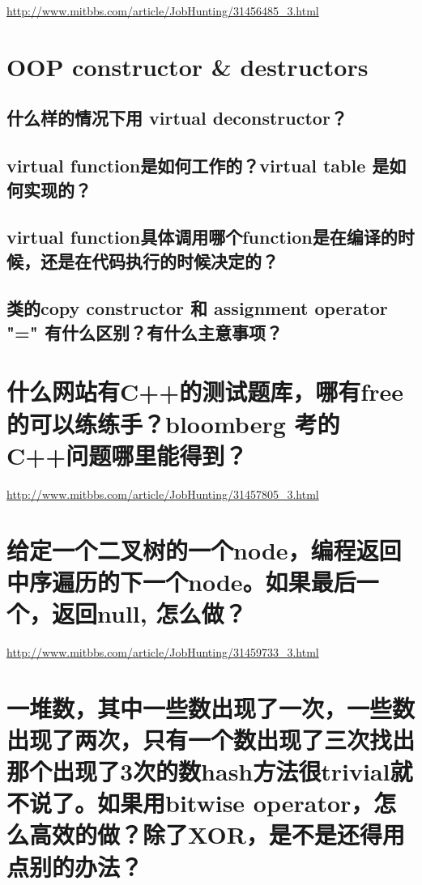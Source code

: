 \documentclass[12pt]{book}
\begin{document}
\url{http://www.mitbbs.com/article/JobHunting/31456485_3.html}

\section{OOP constructor \& destructors}
\label{sec-13-8}
\subsection{什么样的情况下用 virtual deconstructor？}
\label{sec-13-8-1}
\subsection{virtual function是如何工作的？virtual table 是如何实现的？}
\label{sec-13-8-2}
\subsection{virtual function具体调用哪个function是在编译的时候，还是在代码执行的时候决定的？}
\label{sec-13-8-3}
\subsection{类的copy constructor 和 assignment operator "=" 有什么区别？有什么主意事项？}
\label{sec-13-8-4}

\section{什么网站有C++的测试题库，哪有free的可以练练手？bloomberg 考的C++问题哪里能得到？}
\label{sec-13-9}

\url{http://www.mitbbs.com/article/JobHunting/31457805_3.html}

\section{给定一个二叉树的一个node，编程返回中序遍历的下一个node。如果最后一个，返回null, 怎么做？}
\label{sec-13-10}

\url{http://www.mitbbs.com/article/JobHunting/31459733_3.html}

\section{一堆数，其中一些数出现了一次，一些数出现了两次，只有一个数出现了三次找出那个出现了3次的数hash方法很trivial就不说了。如果用bitwise operator，怎么高效的做？除了XOR，是不是还得用点别的办法？}
\label{sec-13-11}
\end{document}
